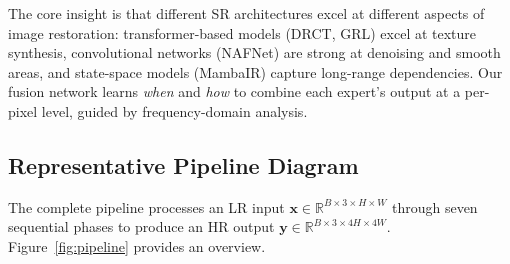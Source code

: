 \documentclass[10pt,twocolumn,letterpaper]{article}
\begin{document}
The core insight is that different SR architectures excel at different aspects of image restoration: transformer-based models (DRCT, GRL) excel at texture synthesis, convolutional networks (NAFNet) are strong at denoising and smooth areas, and state-space models (MambaIR) capture long-range dependencies. Our fusion network learns \textit{when} and \textit{how} to combine each expert's output at a per-pixel level, guided by frequency-domain analysis.

\subsection{Representative Pipeline Diagram}

The complete pipeline processes an LR input $\mathbf{x} \in \mathbb{R}^{B \times 3 \times H \times W}$ through seven sequential phases to produce an HR output $\mathbf{y} \in \mathbb{R}^{B \times 3 \times 4H \times 4W}$. Figure~\ref{fig:pipeline} provides an overview.
\end{document}
